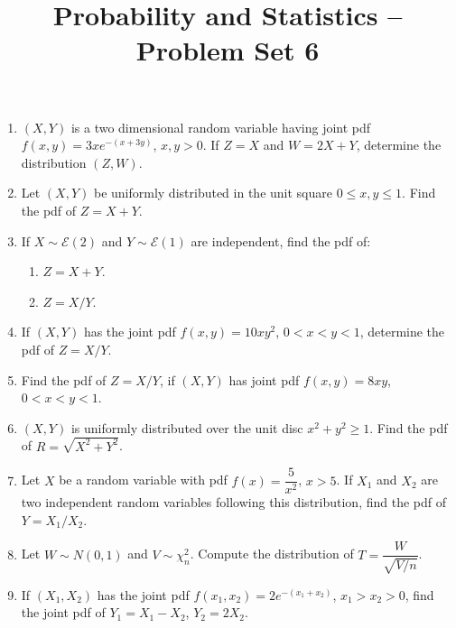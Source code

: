 \documentclass[svgnames]{amsart}
\title[]{Probability and Statistics -- Problem Set 6}
\begin{document}
\maketitle
\begin{enumerate}[leftmargin=*, itemsep=2mm]

\item $(X, Y)$ is a two dimensional random variable having joint pdf $f(x, y) = 3xe^{-(x+3y)}$, $x,y > 0$. If $Z = X$ and $W = 2X + Y$, determine the distribution $(Z, W)$.

\item Let $(X, Y)$ be uniformly distributed in the unit square $0 \le x, y \le 1$. Find the pdf of $Z = X + Y$.

\item If $X \sim \mathcal E(2)$ and $Y \sim \mathcal E(1)$ are independent, find the pdf of:
\begin{enumerate}
	\item $Z = X + Y$.
	\item $Z = X/Y$.
\end{enumerate}

\item If $(X, Y)$ has the joint pdf $f(x, y) = 10xy^2$, $0 < x < y < 1$, determine the pdf of $Z = X/Y$.

\item Find the pdf of $Z = X/Y$, if $(X, Y)$ has joint pdf $f(x, y) = 8xy$, $0 < x < y < 1$.

\item $(X, Y)$ is uniformly distributed over the unit disc $x^2 + y^2 \ge 1$. Find the pdf of $R = \sqrt{X^2 + Y^2}$.

\item Let $X$ be a random variable with pdf $f(x) = \dfrac 5 {x^2}$, $x > 5$. If $X_1$ and $X_2$ are two independent random variables following this distribution, find the pdf of $Y = X_1/X_2$.

\item Let $W \sim N(0, 1)$ and $V \sim \chi^2_n$. Compute the distribution of $T = \dfrac{W}{\sqrt{V/n}}$.

\item If $(X_1, X_2)$ has the joint pdf $f(x_1, x_2) = 2e^{-(x_1 + x_2)}$, $x_1 > x_2 > 0$, find the joint pdf of $Y_1 = X_1 - X_2$, $Y_2 = 2X_2$.

\end{enumerate}
\end{document}
